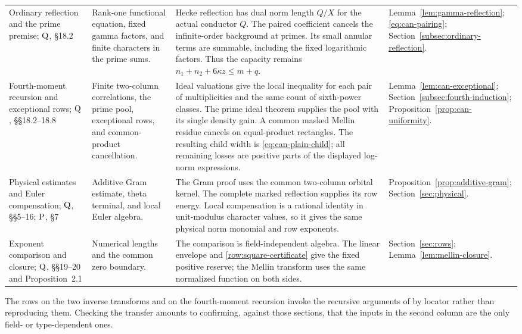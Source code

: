 \documentclass[11pt,a4paper]{article}
\numberwithin{equation}{section}
\theoremstyle{definition}
\theoremstyle{remark}
\newcommand{\Qsrc}{\textup{Q}}
\newcommand{\Psrc}{\textup{P}}
\begin{document}
\begin{longtable}{@{}>{\raggedright\arraybackslash}p{}>{\raggedright\arraybackslash}p{}>{\raggedright\arraybackslash}p{}>{\raggedright\arraybackslash}p{}@{}}
Ordinary reflection and the prime premise; $\Qsrc$, \S18.2
& Rank-one functional equation, fixed gamma factors, and finite
characters in the prime sums.
& Hecke reflection has dual norm length $Q/X$ for the actual conductor
$Q$. The paired coefficient cancels the infinite-order background at
primes. Its small annular terms are summable, including the fixed
logarithmic factors. Thus the capacity remains
$n_1+n_2+6\kappa z\le m+q$.
& Lemma~\ref{lem:gamma-reflection};
\eqref{eq:can-pairing};
Section~\ref{subsec:ordinary-reflection}.\\[3pt]
Fourth-moment recursion and exceptional rows; $\Qsrc$, \S\S18.2--18.8
& Finite two-column correlations, the prime pool, exceptional rows, and
common-product cancellation.
& Ideal valuations give the local inequality for each pair of
multiplicities and the same count of sixth-power classes. The prime
ideal theorem supplies the pool with its single density gain. A common
masked Mellin residue cancels on equal-product rectangles. The resulting
child width is \eqref{eq:can-plain-child}; all remaining losses are
positive parts of the displayed log-norm expressions.
& Lemma~\ref{lem:can-exceptional};
Section~\ref{subsec:fourth-induction};
Proposition~\ref{prop:can-uniformity}.\\[3pt]
Physical estimates and Euler compensation; $\Qsrc$, \S\S5--16;
$\Psrc$, \S7
& Additive Gram estimate, theta terminal, and local Euler algebra.
& The Gram proof uses the common two-column orbital kernel. The complete
marked reflection supplies its row energy. Local compensation is a
rational identity in unit-modulus character values, so it gives the same
physical norm monomial and row exponents.
& Proposition~\ref{prop:additive-gram};
Section~\ref{sec:physical}.\\[3pt]
Exponent comparison and closure; $\Qsrc$, \S\S19--20 and Proposition~2.1
& Numerical lengths and the common zero boundary.
& The comparison is field-independent algebra. The linear envelope and
\eqref{row:square-certificate} give the fixed positive reserve; the
Mellin transform uses the same normalized function on both sides.
& Section~\ref{sec:rows};
Lemma~\ref{lem:mellin-closure}.\\
\end{longtable}
\endgroup

The rows on the two inverse transforms and on the fourth-moment
recursion invoke the recursive arguments of \cite[\S\S17--18]{Q} by
locator rather than reproducing them. Checking the transfer amounts to
confirming, against those sections, that the inputs in the second
column are the only field- or type-dependent ones.
\end{document}
